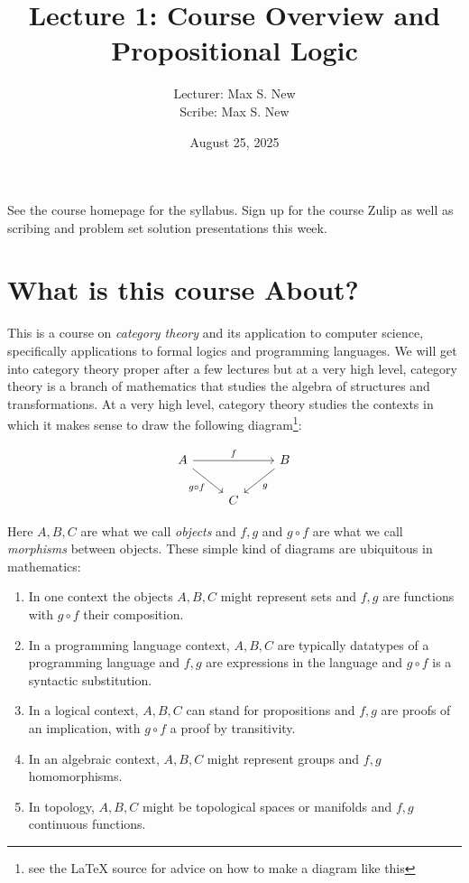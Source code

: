 \documentclass[12pt]{article}
\begin{document}
\title{Lecture 1: Course Overview and Propositional Logic}
\author{Lecturer: Max S. New\\ Scribe: Max S. New}
\date{August 25, 2025}
\maketitle

See the course homepage for the syllabus. Sign up for the course Zulip
as well as scribing and problem set solution presentations this week.

\section{What is this course About?}

This is a course on \emph{category theory} and its application to
computer science, specifically applications to formal logics and
programming languages. We will get into category theory proper after a
few lectures but at a very high level, category theory is a branch of
mathematics that studies the algebra of structures and
transformations. At a very high level, category theory studies the
contexts in which it makes sense to draw the following
diagram\footnote{see the LaTeX source for advice on how to make a
diagram like this}:


\[\begin{tikzcd}
	A && B \\
	& C
	\arrow["f", from=1-1, to=1-3]
	\arrow["{g \circ f}"', from=1-1, to=2-2]
	\arrow["g", from=1-3, to=2-2]
\end{tikzcd}\]

Here $A, B, C$ are what we call \emph{objects} and $f, g$ and $g \circ
f$ are what we call \emph{morphisms} between objects. These simple
kind of diagrams are ubiquitous in mathematics:
\begin{enumerate}
\item In one context the objects $A, B, C$ might represent sets and
  $f, g$ are functions with $g \circ f$ their composition.
\item In a programming language context, $A, B, C$ are typically
  datatypes of a programming language and $f, g$ are expressions in
  the language and $g \circ f$ is a syntactic substitution.
\item In a logical context, $A, B, C$ can stand for propositions and
  $f, g$ are proofs of an implication, with $g \circ f$ a proof by
  transitivity.
\item In an algebraic context, $A, B, C$ might represent groups and $f,g$ homomorphisms.
\item In topology, $A, B, C$ might be topological spaces or manifolds
  and $f, g$ continuous functions.
\end{enumerate}
\end{document}
